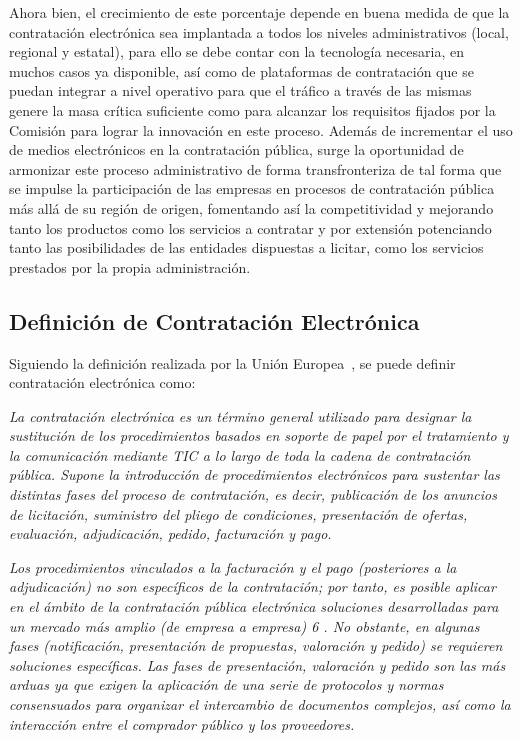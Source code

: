 Ahora bien, el crecimiento de este porcentaje depende en buena medida de que la contratación electrónica sea implantada a todos los niveles
administrativos (local, regional y estatal), para ello se debe contar con la tecnología necesaria, en muchos casos ya disponible, así como
de plataformas de contratación que se puedan integrar a nivel operativo para que el tráfico a través de las mismas genere la masa
crítica suficiente como para alcanzar los requisitos fijados por la Comisión para lograr la innovación en este proceso. Además de incrementar el uso
de medios electrónicos en la contratación pública, surge la oportunidad de armonizar este proceso administrativo de forma transfronteriza
de tal forma que se impulse la participación de las empresas en procesos de contratación pública más allá de su región de origen, fomentando 
así la competitividad y mejorando tanto los productos como los servicios a contratar y por extensión potenciando tanto las posibilidades
de las entidades dispuestas a licitar, como los servicios prestados por la propia administración.


\subsection{Definición de Contratación Electrónica}
Siguiendo la definición realizada por la Unión Europea~\cite{e-Proc-green-paper}, se puede definir contratación electrónica como:

\textit{La contratación electrónica es un término general utilizado para designar la sustitución de los
procedimientos basados en soporte de papel por el tratamiento y la comunicación mediante
TIC a lo largo de toda la cadena de contratación pública. Supone la introducción de
procedimientos electrónicos para sustentar las distintas fases del proceso de contratación, es
decir, publicación de los anuncios de licitación, suministro del pliego de condiciones,
presentación de ofertas, evaluación, adjudicación, pedido, facturación y pago.}

\textit{Los procedimientos vinculados a la facturación y el pago (posteriores a la adjudicación) no
son específicos de la contratación; por tanto, es posible aplicar en el ámbito de la contratación
pública electrónica soluciones desarrolladas para un mercado más amplio (de empresa a
empresa) 6 . No obstante, en algunas fases (notificación, presentación de propuestas,
valoración y pedido) se requieren soluciones específicas. Las fases de presentación,
valoración y pedido son las más arduas ya que exigen la aplicación de una serie de protocolos
y normas consensuados para organizar el intercambio de documentos complejos, así como la
interacción entre el comprador público y los proveedores.}


